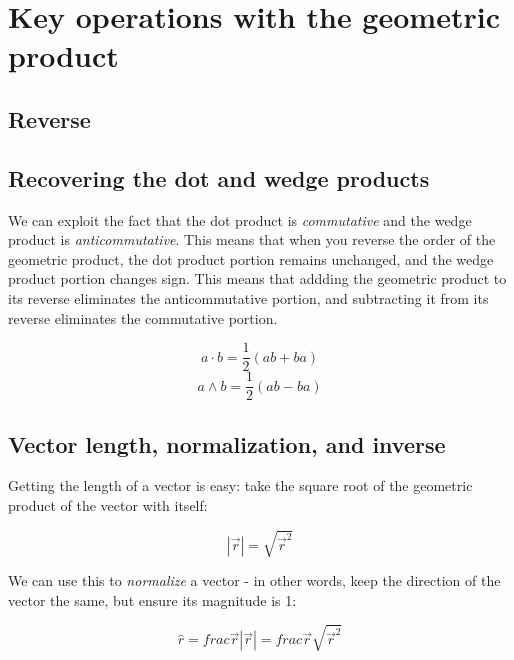 \section{Key operations with the geometric product}

\subsection{Reverse}

\subsection{Recovering the dot and wedge products}

We can exploit the fact that the dot product is \textit{commutative} and the wedge product is
\textit{anticommutative}. This means that when you reverse the order of the geometric product, the
dot product portion remains unchanged, and the wedge product portion changes sign. This means that
addding the geometric product to its reverse eliminates the anticommutative portion, and 
subtracting it from its reverse eliminates the commutative portion.

$$ a \cdot b = \frac{1}{2}\left(ab + ba\right)$$
$$ a \wedge b = \frac{1}{2}\left(ab - ba\right)$$

\subsection{Vector length, normalization, and inverse}

Getting the length of a vector is easy: take the square root of the geometric product of the vector
with itself:

$$\left|\vec{r}\right| = \sqrt{\vec{r}^2}$$

We can use this to \textit{normalize} a vector - in other words, keep the direction of the vector 
the same, but ensure its magnitude is 1:

$$\hat{r} = frac{\vec{r}}{\left|\vec{r}\right|} = frac{\vec{r}}{\sqrt{\vec{r}^2}}$$
